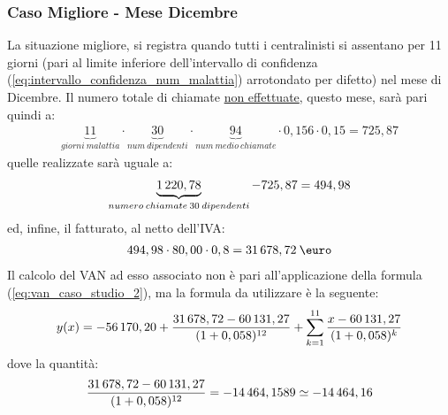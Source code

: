 \subsubsection[Caso Migliore - Mese Dicembre]{Caso Migliore - Mese Dicembre} 
La situazione migliore, si registra quando tutti i centralinisti si assentano per 11 giorni (pari al limite inferiore dell'intervallo di confidenza (\ref{eq:intervallo_confidenza_num_malattia}) arrotondato per difetto) nel mese di Dicembre. \newline
Il numero totale di chiamate \underline{non effettuate}, questo mese, sarà pari quindi a: 
	\begin{equation}
	\label{eq:totale_chiamate_non_effettuate_dicembre}
	\begin{split}
		\underbrace{11}_{giorni \: malattia} \cdot \underbrace{30}_{num\: dipendenti} \cdot \underbrace{94}_{num \: medio \: chiamate} \cdot 0,156 \cdot 0,15 = 725,87 
 	\end{split}
	\end{equation}
quelle realizzate sarà uguale a:
	\begin{equation}
	\label{eq:totale_chiamate_effettuate_dicembre}
	\begin{split}
		\underbrace{1\thinspace 220,78}_{numero\: chiamate \: 30 \: dipendenti} - 725,87 = 494,98
 	\end{split}
	\end{equation}
ed, infine, il fatturato, al netto dell'IVA:
	\begin{equation}
	\label{eq:fatturato_dicembre}
	\begin{split}
		494,98 \cdot 80,00 \cdot 0,8 = 31\thinspace 678,72 \: \mbox{\euro}
 	\end{split}
	\end{equation}
Il calcolo del VAN ad esso associato non è pari all'applicazione della formula (\ref{eq:van_caso_studio_2}), ma la formula da utilizzare è la seguente:
	\begin{equation}
	\label{eq:van_caso_dicembre}
	\begin{split}
		y(x) = -56\thinspace 170,20 + \frac{31\thinspace 678,72 - 60\thinspace 131,27}{(1+0,058)^{12}} + \sum_{k=1}^{11} \frac{x - 60\thinspace 131,27} {(1+0,058)^{k}}
 	\end{split}
	\end{equation}
dove la quantità:
	\begin{equation}
	\label{eq:attualizzazione_dicembre}
	\begin{split}
		\frac{31\thinspace 678,72 - 60\thinspace 131,27}{(1+0,058)^{12}} = -14\thinspace 464,1589 \simeq -14\thinspace 464,16
 	\end{split}
	\end{equation}
